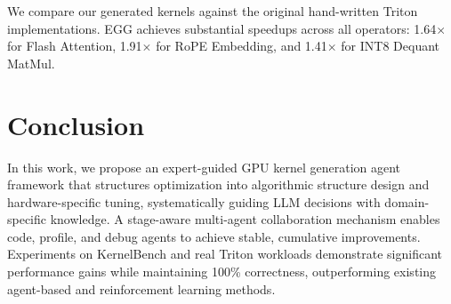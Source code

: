 \documentclass{article}
\theoremstyle{plain}
\theoremstyle{definition}
\theoremstyle{remark}
\begin{document}
We compare our generated kernels against the original hand-written Triton implementations. EGG achieves substantial speedups across all operators: 1.64$\times$ for Flash Attention, 1.91$\times$ for RoPE Embedding, and 1.41$\times$ for INT8 Dequant MatMul. 

\section{Conclusion}
In this work, we propose an expert-guided GPU kernel generation agent framework that structures optimization into algorithmic structure design and hardware-specific tuning, systematically guiding LLM decisions with domain-specific knowledge. A stage-aware multi-agent collaboration mechanism enables code, profile, and debug agents to achieve stable, cumulative improvements. Experiments on KernelBench and real Triton workloads demonstrate significant performance gains while maintaining 100\% correctness, outperforming existing agent-based and reinforcement learning methods.
 
\nocite{langley00}



\end{document}
